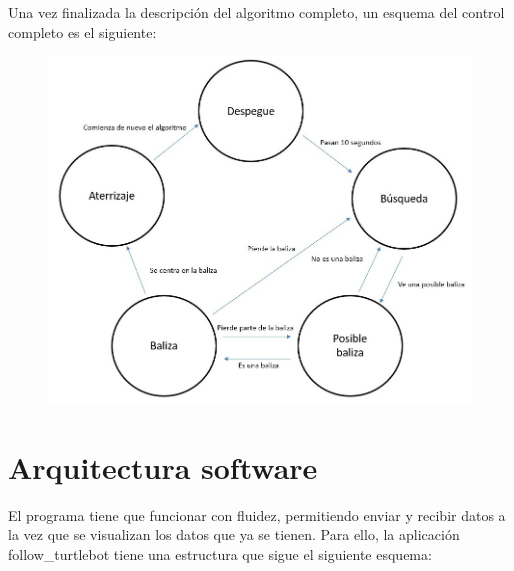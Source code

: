 \hspace{1 cm} Una vez finalizada la descripci\'on del algoritmo completo, un esquema del control completo es el siguiente:
\begin{figure}[H]
	\centering
		\includegraphics[width=1\textwidth]{imgs/EsquemaAlgoritmo.jpg}
	\label{fig:Esquema_control}
\end{figure}





\section{Arquitectura software}

\hspace{1 cm} El programa tiene que funcionar con fluidez, permitiendo enviar y recibir datos a la vez que se visualizan los datos que ya se tienen. Para ello, la aplicaci\'on follow\_turtlebot tiene una estructura que sigue el siguiente esquema:

